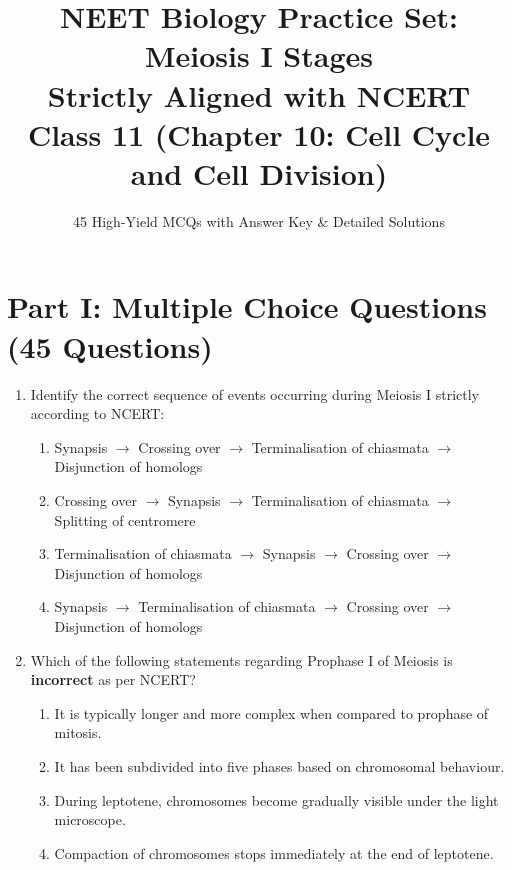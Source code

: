 \documentclass[11pt,a4paper]{article}
\title{\textbf{NEET Biology Practice Set: Meiosis I Stages}\\ \large Strictly Aligned with NCERT Class 11 (Chapter 10: Cell Cycle and Cell Division)}
\author{45 High-Yield MCQs with Answer Key \& Detailed Solutions}
\date{}
\begin{document}
\maketitle

\section*{Part I: Multiple Choice Questions (45 Questions)}

\begin{enumerate}[label=\textbf{\arabic*.}]

\item Identify the correct sequence of events occurring during Meiosis I strictly according to NCERT:
\begin{enumerate}[label=(\Alph*)]
    \item Synapsis $\rightarrow$ Crossing over $\rightarrow$ Terminalisation of chiasmata $\rightarrow$ Disjunction of homologs
    \item Crossing over $\rightarrow$ Synapsis $\rightarrow$ Terminalisation of chiasmata $\rightarrow$ Splitting of centromere
    \item Terminalisation of chiasmata $\rightarrow$ Synapsis $\rightarrow$ Crossing over $\rightarrow$ Disjunction of homologs
    \item Synapsis $\rightarrow$ Terminalisation of chiasmata $\rightarrow$ Crossing over $\rightarrow$ Disjunction of homologs
\end{enumerate}

\item Which of the following statements regarding Prophase I of Meiosis is \textbf{incorrect} as per NCERT?
\begin{enumerate}[label=(\Alph*)]
    \item It is typically longer and more complex when compared to prophase of mitosis.
    \item It has been subdivided into five phases based on chromosomal behaviour.
    \item During leptotene, chromosomes become gradually visible under the light microscope.
    \item Compaction of chromosomes stops immediately at the end of leptotene.
\end{enumerate}


\end{enumerate}
\end{document}

